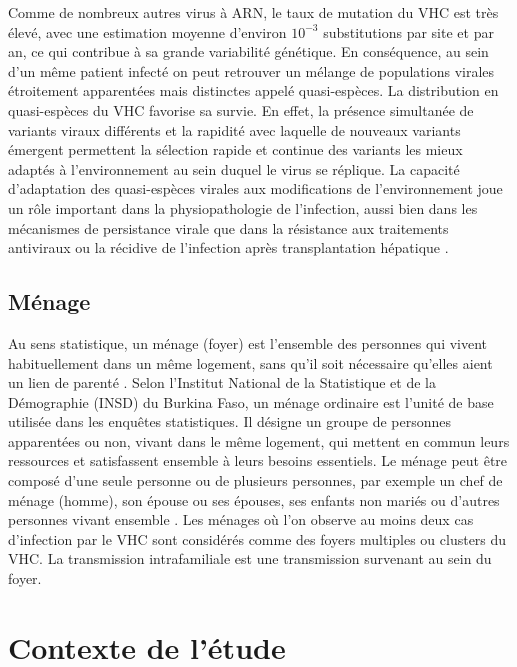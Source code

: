 \documentclass[a4paper,12pt]{article}
\begin{document}
Comme de nombreux autres virus à ARN, le taux de mutation du VHC est très élevé, avec une estimation  moyenne d'environ $10^{-3}$ substitutions par site et par an, ce qui contribue à sa grande variabilité génétique.  En conséquence, au sein d’un même patient infecté on peut retrouver un mélange de populations virales étroitement apparentées mais distinctes appelé quasi-espèces. La distribution en quasi-espèces du VHC favorise sa survie. En effet, la présence simultanée de variants viraux différents et la rapidité avec laquelle de nouveaux variants émergent permettent la sélection rapide et continue des variants les mieux adaptés à l’environnement au sein duquel le virus se réplique. La capacité d’adaptation des quasi-espèces virales aux modifications de l’environnement joue un rôle important dans la physiopathologie de l’infection, aussi bien dans les mécanismes de persistance virale que dans la résistance aux traitements antiviraux ou la récidive de l’infection après transplantation hépatique \cite{pawlotskyVirusLhepatite2002,mennecierVirusLhepatiteMonhepatogastro2022}.


\subsection{Ménage}

Au sens statistique, un ménage (foyer) est l'ensemble des personnes qui vivent habituellement dans un même logement, sans qu'il soit nécessaire qu'elles aient un lien de parenté \cite{MenageInsee}. Selon l'Institut National de la Statistique et de la Démographie (INSD) du Burkina Faso, un ménage ordinaire est l'unité de base utilisée dans les enquêtes statistiques. Il désigne un groupe de personnes apparentées ou non, vivant dans le même logement, qui mettent en commun leurs ressources et satisfassent ensemble à leurs besoins essentiels. Le ménage peut être composé d’une seule personne ou de plusieurs personnes, par exemple un chef de ménage (homme), son épouse  ou ses épouses, ses enfants non mariés ou d’autres personnes vivant ensemble \cite{BurkinaFasoRecensement}. Les ménages où l'on observe au moins deux cas d'infection par le VHC sont considérés comme des foyers multiples ou clusters du VHC. La transmission intrafamiliale est une transmission survenant au sein du foyer. 

\newpage 

\section{Contexte de l'étude}
\end{document}
